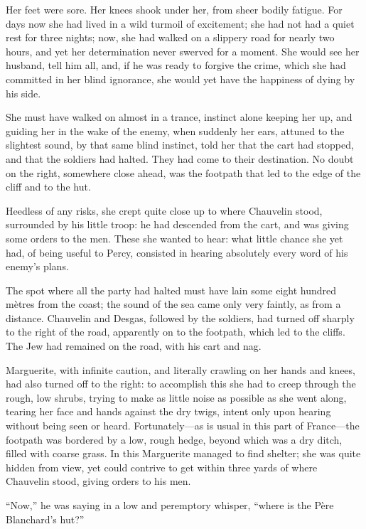 \documentclass[paper=a5,BCOR=7mm,twoside,DIV=calc,12pt,usegeometry,chapterprefix,endperiod,headings=big]{scrbook}
\begin{document}
Her feet were sore. Her knees shook under her, from sheer bodily fatigue. For days now she had lived in a wild turmoil of excitement; she had not had a quiet rest for three nights; now, she had walked on a slippery road for nearly two hours, and yet her determination never swerved for a moment. She would see her husband, tell him all, and, if he was ready to forgive the crime, which she had committed in her blind ignorance, she would yet have the happiness of dying by his side.

She must have walked on almost in a trance, instinct alone keeping her up, and guiding her in the wake of the enemy, when suddenly her ears, attuned to the slightest sound, by that same blind instinct, told her that the cart had stopped, and that the soldiers had halted. They had come to their destination. No doubt on the right, somewhere close ahead, was the footpath that led to the edge of the cliff and to the hut.

Heedless of any risks, she crept quite close up to where Chauvelin stood, surrounded by his little troop: he had descended from the cart, and was giving some orders to the men. These she wanted to hear: what little chance she yet had, of being useful to Percy, consisted in hearing absolutely every word of his enemy's plans.

The spot where all the party had halted must have lain some eight hundred mètres from the coast; the sound of the sea came only very faintly, as from a distance. Chauvelin and Desgas, followed by the soldiers, had turned off sharply to the right of the road, apparently on to the footpath, which led to the cliffs. The Jew had remained on the road, with his cart and nag.

Marguerite, with infinite caution, and literally crawling on her hands and knees, had also turned off to the right: to accomplish this she had to creep through the rough, low shrubs, trying to make as little noise as possible as she went along, tearing her face and hands against the dry twigs, intent only upon hearing without being seen or heard. Fortunately---as is usual in this part of France---the footpath was bordered by a low, rough hedge, beyond which was a dry ditch, filled with coarse grass. In this Marguerite managed to find shelter; she was quite hidden from view, yet could contrive to get within three yards of where Chauvelin stood, giving orders to his men.

\enquote{Now,} he was saying in a low and peremptory whisper, \enquote{where is the Père Blanchard's hut?}
\end{document}
